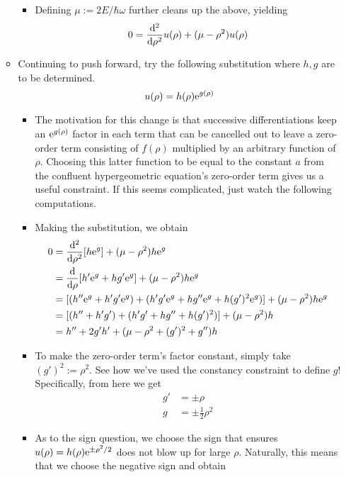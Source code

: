\documentclass[../finalProject.tex]{subfiles}
\begin{document}
\begin{itemize}
\begin{itemize}
\begin{itemize}
            \item Defining $\mu:=2E/\hbar\omega$ further cleans up the above, yielding
            \begin{equation*}
                0 = \dv[2]{\rho}u(\rho)+(\mu-\rho^2)u(\rho)
            \end{equation*}
        \end{itemize}
        \item Continuing to push forward, try the following substitution where $h,g$ are to be determined.
        \begin{equation*}
            u(\rho) = h(\rho)\e[g(\rho)]
        \end{equation*}
        \begin{itemize}
            \item The motivation for this change is that successive differentiations keep an $\e[g(\rho)]$ factor in each term that can be cancelled out to leave a zero-order term consisting of $f(\rho)$ multiplied by an arbitrary function of $\rho$. Choosing this latter function to be equal to the constant $a$ from the confluent hypergeometric equation's zero-order term gives us a useful constraint. If this seems complicated, just watch the following computations.
            \item Making the substitution, we obtain
            \begin{align*}
                0 &= \dv[2]{\rho}[h\e[g]]+(\mu-\rho^2)h\e[g]\\
                &= \dv{\rho}[h'\e[g]+hg'\e[g]]+(\mu-\rho^2)h\e[g]\\
                &= [(h''\e[g]+h'g'\e[g])+(h'g'\e[g]+hg''\e[g]+h(g')^2\e[g])]+(\mu-\rho^2)h\e[g]\\
                &= [(h''+h'g')+(h'g'+hg''+h(g')^2)]+(\mu-\rho^2)h\\
                &= h''+2g'h'+(\mu-\rho^2+(g')^2+g'')h
            \end{align*}
            \item To make the zero-order term's factor constant, simply take $(g')^2:=\rho^2$. See how we've used the constancy constraint to define $g$! Specifically, from here we get
            \begin{align*}
                g' &= \pm\rho\\
                g &= \pm\frac{1}{2}\rho^2
            \end{align*}
            \item As to the sign question, we choose the sign that ensures $u(\rho)=h(\rho)\e[\pm\rho^2/2]$ does not blow up for large $\rho$. Naturally, this means that we choose the negative sign and obtain

\end{itemize}
\end{itemize}
\end{itemize}
\end{document}
